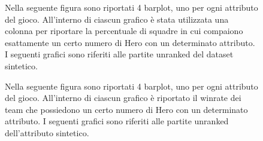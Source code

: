 \begin{figure}[htbp]
\begin{center}

\caption{Nella seguente figura sono riportati 4 barplot, uno per ogni attributo del gioco. All'interno di ciascun grafico è stata utilizzata una colonna per riportare la percentuale di squadre in cui compaiono esattamente un certo numero di Hero con un determinato attributo. I seguenti grafici sono riferiti alle partite unranked del dataset sintetico. }
\label{pickrate_attributi_unranked_merged_sintetico}
\end{center}
\end{figure}
\begin{figure}[htbp]
\begin{center}

\caption{Nella seguente figura sono riportati 4 barplot, uno per ogni attributo del gioco. All'interno di ciascun grafico è riportato il winrate dei team che possiedono un certo numero di Hero con un determinato attributo. I seguenti grafici sono riferiti alle partite unranked dell'attributo sintetico.}
\label{winrate_attributi_unranked_merged_sintetico}
\end{center}
\end{figure}
